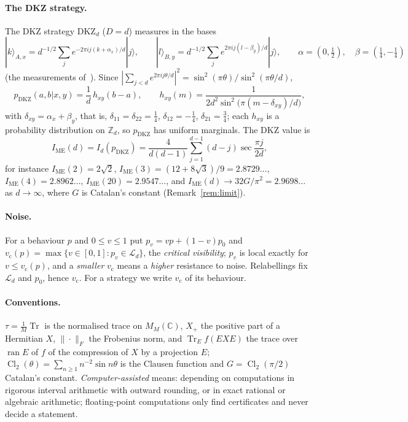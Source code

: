 \documentclass[11pt]{article}
\theoremstyle{remark}
\numberwithin{equation}{section}
\newcommand{\Z}{\mathbb{Z}}
\newcommand{\C}{\mathbb{C}}
\newcommand{\Tr}{\operatorname{Tr}}
\newcommand{\Cl}{\operatorname{Cl}_2}
\newcommand{\IME}{I_{\mathrm{ME}}}
\newcommand{\cL}{\mathcal{L}}
\newcommand{\vc}{v_{\mathrm c}}
\newcommand{\DKZ}{\mathrm{DKZ}}
\begin{document}
\paragraph{The DKZ strategy.}
The DKZ strategy $\DKZ_d$ ($D=d$) measures in the bases
\[
|k\rangle_{A,x}=d^{-1/2}\sum_je^{-2\pi ij(k+\alpha_x)/d}|j\rangle,\qquad|l\rangle_{B,y}=d^{-1/2}\sum_je^{2\pi ij(l-\beta_y)/d}|j\rangle,
\qquad\alpha=(0,\tfrac12),\quad\beta=(\tfrac14,-\tfrac14)
\]
(the measurements of~\cite[eqs.~(12)--(15)]{CGLMP}). Since
$|\sum_{j<d}e^{2\pi ij\theta/d}|^2=\sin^2(\pi\theta)/\sin^2(\pi\theta/d)$,
\begin{equation}\label{eq:dkzclosed}
p_{\DKZ}(a,b|x,y)=\frac1d\,h_{xy}(b-a),\qquad h_{xy}(m)=\frac1{2d^2\sin^2\bigl(\pi(m-\delta_{xy})/d\bigr)},
\end{equation}
with $\delta_{xy}=\alpha_x+\beta_y$, that is, $\delta_{11}=\delta_{22}=\frac14$, $\delta_{12}=-\frac14$, $\delta_{21}=\frac34$;
each $h_{xy}$ is a probability distribution on $\Z_d$, so $p_{\DKZ}$ has uniform marginals. The DKZ value
is~\cite{DKZ,CGLMP}
\begin{equation}\label{eq:IME}
\IME(d)=I_d(p_{\DKZ})=\frac{4}{d(d-1)}\sum_{j=1}^{d-1}(d-j)\sec\frac{\pi j}{2d},
\end{equation}
for instance $\IME(2)=2\sqrt2$, $\IME(3)=(12+8\sqrt3)/9=2.8729\ldots$, $\IME(4)=2.8962\ldots$, $\IME(20)=2.9547\ldots$, and
$\IME(d)\to32G/\pi^2=2.9698\ldots$ as $d\to\infty$, where $G$ is Catalan's constant (Remark~\ref{rem:limit}).

\paragraph{Noise.}
For a behaviour $p$ and $0\le v\le1$ put $p_v=vp+(1-v)p_0$ and $\vc(p)=\max\{v\in[0,1]:p_v\in\cL_d\}$, the
\emph{critical visibility}; $p_v$ is local exactly for $v\le\vc(p)$, and a \emph{smaller} $\vc$ means a \emph{higher}
resistance to noise. Relabellings fix $\cL_d$ and $p_0$, hence $\vc$. For a strategy we write $\vc$ of its behaviour.

\paragraph{Conventions.}
$\tau=\frac1M\Tr$ is the normalised trace on $M_M(\C)$, $X_+$ the positive part of a Hermitian $X$, $\|\cdot\|_F$ the
Frobenius norm, and $\Tr_Ef(EXE)$ the trace over $\operatorname{ran}E$ of $f$ of the compression of $X$ by a projection
$E$; $\Cl(\theta)=\sum_{n\ge1}n^{-2}\sin n\theta$ is the Clausen function and $G=\Cl(\pi/2)$ Catalan's constant.
\emph{Computer-assisted} means: depending on computations in rigorous interval arithmetic with outward rounding, or in
exact rational or algebraic arithmetic; floating-point computations only find certificates and never decide a statement.
\end{document}
